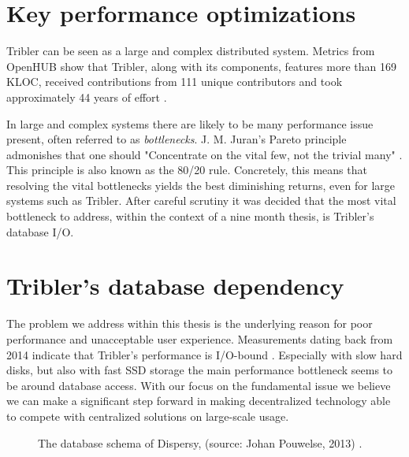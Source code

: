\section{Key performance optimizations}

Tribler can be seen as a large and complex distributed system.
Metrics from OpenHUB show that Tribler, along with its components, features more than 169 KLOC, received contributions from 111 unique contributors and took approximately 44 years of effort \cite{openhub2016tribler}.

In large and complex systems there are likely to be many performance issue present, often referred to as \emph{bottlenecks}.
J. M. Juran's Pareto principle admonishes that one should "Concentrate on the vital few, not the trivial many" \cite{ammons2004finding}. This principle is also known as the 80/20 rule.
Concretely, this means that resolving the vital bottlenecks yields the best diminishing returns, even for large systems such as Tribler.
After careful scrutiny it was decided that the most vital bottleneck to address, within the context of a nine month thesis, is Tribler's database I/O.

\section{Tribler's database dependency}

The problem we address within this thesis is the underlying reason for poor performance and unacceptable user experience. 
Measurements dating back from 2014 indicate that Tribler's performance is I/O-bound \cite{pouwelse2014reduce}.
Especially with slow hard disks, but also with fast SSD storage the main performance bottleneck seems to be around database access.
With our focus on the fundamental issue we believe we can make a significant step forward in making decentralized technology able to compete with centralized solutions on large-scale usage.

\begin{figure}[!h]
	\caption{The database schema of Dispersy, (source: Johan Pouwelse, 2013) \cite{pouwelse2013documentation}.}
	\label{fig:dispersy_database_schema}
\end{figure}

